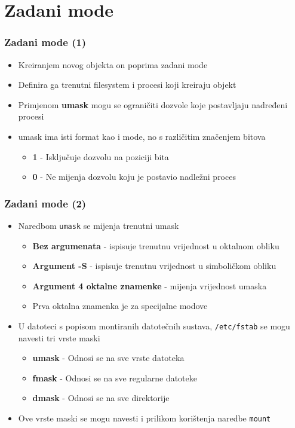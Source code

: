 \documentclass[table,usenames,dvipsnames]{beamer}
\newcommand{\shell}[1]{\texttt{#1}}
\begin{document}
\section{Zadani mode}
\begin{frame}[t]
\frametitle{Zadani mode (1)}
\begin{itemize}
	\item Kreiranjem novog objekta on poprima zadani mode
	\item Definira ga trenutni filesystem i procesi koji kreiraju objekt
\end{itemize}
\begin{itemize}
	\item Primjenom \textbf{umask} mogu se ograničiti dozvole koje postavljaju nadređeni procesi
	\item umask ima isti format kao i mode, no s različitim značenjem bitova
	\begin{itemize}
		\item \textbf{1} - Isključuje dozvolu na poziciji bita
		\item \textbf{0} - Ne mijenja dozvolu koju je postavio nadležni proces
	\end{itemize}
\end{itemize}
\end{frame}

\begin{frame}[t]
	\frametitle{Zadani mode (2)}
\begin{itemize}
	\item Naredbom \shell{umask} se mijenja trenutni umask
	\begin{itemize}
		\item \textbf{Bez argumenata} - ispisuje trenutnu vrijednost u oktalnom obliku
		\item \textbf{Argument -S} - ispisuje trenutnu vrijednost u simboličkom obliku
		\item \textbf{Argument 4 oktalne znamenke} - mijenja vrijednost umaska
		\item[] \hspace{1em} Prva oktalna znamenka je za specijalne modove
	\end{itemize}
\end{itemize}
\begin{itemize}
	\item U datoteci s popisom montiranih datotečnih sustava, \shell{/etc/fstab} se mogu navesti tri vrste maski
	\begin{itemize}
		\item \textbf{umask} - Odnosi se na sve vrste datoteka
		\item \textbf{fmask} - Odnosi se na sve regularne datoteke
		\item \textbf{dmask} - Odnosi se na sve direktorije
	\end{itemize}
	\item Ove vrste maski se mogu navesti i prilikom korištenja naredbe \shell{mount}
\end{itemize}
\end{frame}
  
\end{document}
